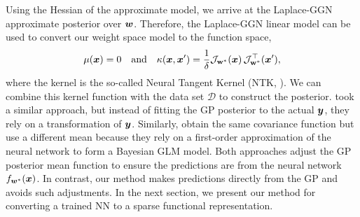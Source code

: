 \documentclass{article} %
\newcommand{\dataset}{\ensuremath{\mathcal{D}}}
\newcommand{\weights}{\ensuremath{\mathbf{w}}}
\newcommand{\Jac}[2]{\mathcal{J}_{#1}(#2)}
\newcommand{\JacT}[2]{\mathcal{J}_{#1}^\top(#2)}
\newcommand{\GP}{\mathcal{GP}}
\begin{document}
Using the Hessian of the approximate model, we arrive at the Laplace-GGN approximate posterior over ${\bm{w}}$.
Therefore, the Laplace-GGN linear model can be used to convert our weight space model to the function space,
\begin{equation}
\label{eq-laplace-approx-function-space}
  \mu(\vx) =  0 \quad \text{and} \quad
  \kappa(\vx, \vx')
  = \frac{1}{\delta} \Jac{\weights^*}{\vx} \, \JacT{\weights^*}{\vx'},
\end{equation}
where the kernel is the so-called Neural Tangent Kernel (NTK, \cite{jacot2018neural}).
We can combine this kernel function with the data set $\dataset$ to construct the posterior.
%
\citet{khan2019approximate} took a similar approach, but instead of fitting the GP posterior to the actual ${\bm{y}}$, they rely on a transformation of ${\bm{y}}$. Similarly, \citet{immer2021improving} obtain the same covariance function but use a different mean because they rely on a first-order approximation of the neural network to form a Bayesian GLM model. Both approaches adjust the GP posterior mean function to ensure the predictions are from the neural network $f_{{\bm{w}}^*}({\bm{x}})$.
In contrast, our method makes predictions directly from the GP and avoids such adjustments.
In the next section, we present our method for converting a trained NN to a sparse functional representation.
\end{document}
